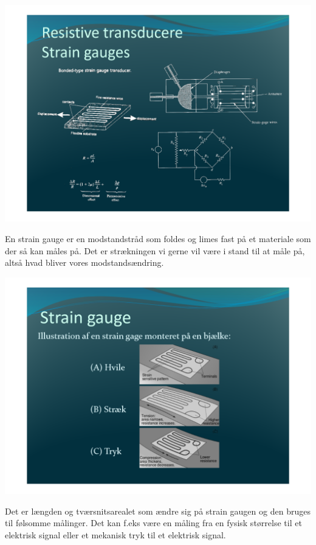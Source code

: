 \documentclass[12pt, letterpaper]{article}
\begin{document}
\begin{center}
\includegraphics[width=\textwidth]{billeder/billede29}
\end{center}
En strain gauge er en modstandstråd som foldes og limes fast på et materiale som der så kan måles på. Det er strækningen vi gerne vil være i stand til at måle på, altså hvad bliver vores modstandsændring.


\begin{center}
\includegraphics[width=\textwidth]{billeder/billede30}
\end{center}

Det er længden og tværsnitsarealet som ændre sig på strain gaugen og den bruges til følsomme målinger. Det kan f.eks være en måling fra en fysisk størrelse til et elektrisk signal eller et mekanisk tryk til et elektrisk signal.
\end{document}
